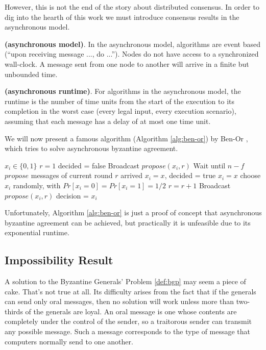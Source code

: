 \bigskip
\noindent
However, this is not the end of the story about distributed consensus. In order to dig into the hearth of this work we must introduce consensus results in the asynchronous model.
\begin{mydef}{\bf (asynchronous model)}.
    In the asynchronous model, algorithms are event based (\enquote{upon receiving message ..., do ...}). Nodes do not have access to a synchronized wall-clock. A message sent from one node to another will arrive in a finite but unbounded time.
\end{mydef}
\begin{mydef}{\bf (asynchronous runtime)}.
    For algorithms in the asynchronous model, the runtime is the number of time units from the start of the execution to its completion in the worst case (every legal input, every execution scenario), assuming that each message has a delay of at most one time unit.    
\end{mydef}

\bigskip
\noindent
We will now present a famous algorithm (Algorithm \ref{alg:ben-or}) by Ben-Or \cite{Ben-Or:1983:AFC:800221.806707}, which tries to solve asynchronous byzantine agreement.

\bigskip
\begin{algorithm}
	\caption{Asynchronous Byzantine Agreement (Ben-Or, for $f < n/9$)}
	\label{alg:ben-or}
	\begin{algorithmic}[1]
		\State $x_{i} \in \{0,1\}$ 
		\State $r=1$ 
		\State decided = false
		\State Broadcast $propose(x_{i},r)$
		\Repeat
		\State Wait until $n-f$ $propose$ messages of current round $r$ arrived
		\State $x_{i}=x$, decided = true
		\State $x_{i}=x$
		\Else
		\State choose $x_{i}$ randomly, with $Pr[x_{i}=0] = Pr[x_{i}=1] = 1/2$
		\EndIf
		\State $r=r+1$
		\State Broadcast $propose(x_{i},r)$
		\State decision = $x_{i}$
	\end{algorithmic}
\end{algorithm}

\bigskip
\noindent
Unfortunately, Algorithm \ref{alg:ben-or} is just a proof of concept that asynchronous byzantine agreement can be achieved, but practically it is unfeasible due to its exponential runtime.

\bigskip
\subsection{Impossibility Result}
\label{sec:impossibility-result}
A solution to the Byzantine Generals' Problem \ref{def:bgp} may seem a piece of cake. That's not true at all. Its difficulty arises from the fact that if the generals can send only oral messages, then no solution will work unless more than two-thirds of the generals are loyal. An oral message is one whose contents are completely under the control of the sender, so a traitorous sender can transmit any possible message.
Such a message corresponds to the type of message that computers normally send to one another.


